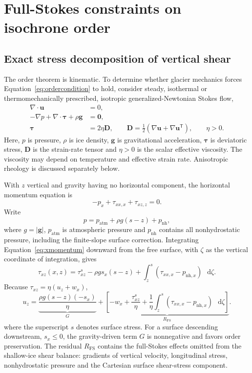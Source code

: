 \documentclass[review]{igs}
\theoremstyle{definition}
\theoremstyle{remark}
\newcommand{\dd}{\mathop{}\!\mathrm{d}}
\newcommand{\uvec}{\bm{u}}
\newcommand{\taut}{\bm{\tau}}
\newcommand{\Dten}{\bm{D}}
\begin{document}
\section{Full-Stokes constraints on isochrone order}

\subsection{Exact stress decomposition of vertical shear}

The order theorem is kinematic. To determine whether glacier mechanics forces Equation~\eqref{eq:ordercondition} to hold, consider steady, isothermal or thermomechanically prescribed, isotropic generalized-Newtonian Stokes flow,
\begin{align}
\nabla\cdot\uvec&=0,
\label{eq:mass}\\
-\nabla p+\nabla\cdot\taut+\rho\bm{g}&=\bm{0},
\label{eq:momentum}\\
\taut&=2\eta\Dten,
\qquad
\Dten=\tfrac12\left(\nabla\uvec+\nabla\uvec^{\mathsf T}\right),
\qquad \eta>0.
\label{eq:rheology}
\end{align}
Here, \(p\) is pressure, \(\rho\) is ice density, \(\bm{g}\) is gravitational acceleration, \(\taut\) is deviatoric stress, \(\Dten\) is the strain-rate tensor and \(\eta>0\) is the scalar effective viscosity. The viscosity may depend on temperature and effective strain rate. Anisotropic rheology is discussed separately below.

With \(z\) vertical and gravity having no horizontal component, the horizontal momentum equation is
\begin{equation}
-p_x+\tau_{xx,x}+\tau_{xz,z}=0.
\label{eq:xmomentum}
\end{equation}
Write
\begin{equation}
p=p_{\mathrm{atm}}+\rho g(s-z)+p_{\mathrm{nh}},
\end{equation}
where \(g=|\bm{g}|\), \(p_{\mathrm{atm}}\) is atmospheric pressure and \(p_{\mathrm{nh}}\) contains all nonhydrostatic pressure, including the finite-slope surface correction. Integrating Equation~\eqref{eq:xmomentum} downward from the free surface, with \(\zeta\) as the vertical coordinate of integration, gives
\begin{equation}
\tau_{xz}(x,z)
=\tau_{xz}^{s}
-\rho g s_x(s-z)
+\int_z^s\left(\tau_{xx,x}-p_{\mathrm{nh},x}\right)\,\dd\zeta.
\label{eq:tauxzint}
\end{equation}
Because \(\tau_{xz}=\eta(u_z+w_x)\),
\begin{equation}
\boxed{
 u_z
 =\underbrace{\frac{\rho g(s-z)(-s_x)}{\eta}}_{G}
 +\underbrace{
 \left[
 -w_x+\frac{\tau_{xz}^{s}}{\eta}
 +\frac{1}{\eta}\int_z^s
 \left(\tau_{xx,x}-p_{\mathrm{nh},x}\right)\,\dd\zeta
 \right]}_{R_{\mathrm{FS}}}.
}
\label{eq:uzdecomp}
\end{equation}
where the superscript \(s\) denotes surface stress. For a surface descending downstream, \(s_x\leq0\), the gravity-driven term \(G\) is nonnegative and favors order preservation. The residual \(R_{\mathrm{FS}}\) contains the full-Stokes effects omitted from the shallow-ice shear balance: gradients of vertical velocity, longitudinal stress, nonhydrostatic pressure and the Cartesian surface shear-stress component.
\end{document}
